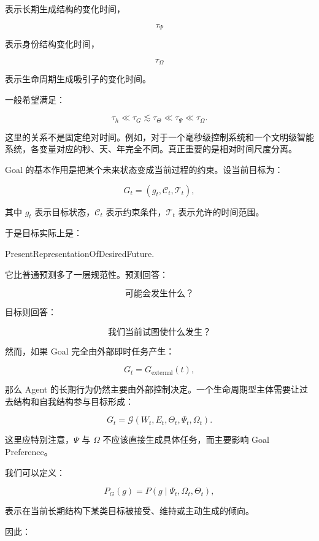 表示长期生成结构的变化时间，

\[
\tau_\Psi
\]

表示身份结构变化时间，

\[
\tau_\Omega
\]

表示生命周期生成吸引子的变化时间。

一般希望满足：

\[
\boxed{
\tau_h
\ll
\tau_G
\lesssim
\tau_\Theta
\ll
\tau_\Psi
\ll
\tau_\Omega.
}
\]

这里的关系不是固定绝对时间。例如，对于一个毫秒级控制系统和一个文明级智能系统，各变量对应的秒、天、年完全不同。真正重要的是相对时间尺度分离。

Goal 的基本作用是把某个未来状态变成当前过程的约束。设当前目标为：

\[
G_t
=
(g_t,\mathcal{C}_t,\mathcal{T}_t),
\]

其中 $g_t$ 表示目标状态，$\mathcal{C}_t$ 表示约束条件，$\mathcal{T}_t$ 表示允许的时间范围。

于是目标实际上是：

\begin{statementbox}
PresentRepresentationOfDesiredFuture.
\end{statementbox}

它比普通预测多了一层规范性。预测回答：

\[
\text{可能会发生什么？}
\]

目标则回答：

\[
\text{我们当前试图使什么发生？}
\]

然而，如果 Goal 完全由外部即时任务产生：

\[
G_t
=
G_{\mathrm{external}}(t),
\]

那么 Agent 的长期行为仍然主要由外部控制决定。一个生命周期型主体需要让过去结构和自我结构参与目标形成：

\[
G_t
=
\mathcal{G}
\left(
W_t,
E_t,
\Theta_t,
\Psi_t,
\Omega_t
\right).
\]

这里应特别注意，$\Psi$ 与 $\Omega$ 不应该直接生成具体任务，而主要影响 Goal Preference。

我们可以定义：

\[
P_G(g)
=
P
\left(
g
\mid
\Psi_t,\Omega_t,\Theta_t
\right),
\]

表示在当前长期结构下某类目标被接受、维持或主动生成的倾向。

因此：

\begin{statementbox}
\centering
{}
\end{statementbox}


